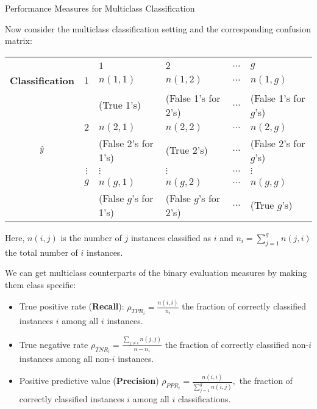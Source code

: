 \begin{vbframe}{Performance Measures for Multiclass Classification}
	\scriptsize{
		Now consider the multiclass classification setting and the corresponding confusion matrix:
		\begin{center}
			\tiny
			\begin{tabular}{cc|>{\centering\arraybackslash}p{8em}>{\centering\arraybackslash}p{8em}>{\centering\arraybackslash}p{5em}>{\centering\arraybackslash}p{8em}}
				& & \multicolumn{4}{c}{\bfseries True Class $y$} \\
				& & $1$ & $2$ & $\ldots$ & $g$  \\
				\hline
				\bfseries Classification     & $1$ & $n(1,1)$  &  $n(1,2)$  & $\ldots$ &  $n(1,g)$ \\
				& & (True 1's) & (False 1's for 2's) & $\ldots$ &  (False 1's for $g$'s)  \\
				& $2$ &  $n(2,1)$  &  $n(2,2)$  & $\ldots$ & $n(2,g)$  \\
				$\hat{y}$ & & (False 2's for 1's) & (True 2's) & $\ldots$ &  (False 2's for $g$'s)  \\
				& $\vdots$ & $\vdots$ & $\vdots$ & $\ldots$ & $\vdots$ \\
				& $g$ & $n(g,1)$ & $n(g,2)$  & $\ldots$ &  $n(g,g)$\\
				& & (False $g$'s for 1's) & (False $g$'s for 2's) & $\ldots$ &  (True $g$'s)  \\
			\end{tabular}
		\end{center}
		Here, $n(i,j)$ is the number of $j$ instances classified as $i$ and $n_i = \sum_{j=1}^g n(j,i)$ the total number of $i$ instances.
%		
		
		We can get multiclass counterparts of the binary evaluation measures by making them class specific: 
		
		\begin{itemize}
			
			\item True positive rate (\textbf{Recall}): $\rho_{TPR_i} = \frac{n(i,i)}{n_i}$ \quad the fraction of correctly classified instances $i$ among all $i$ instances.
			\item True negative rate $\rho_{TNR_i} = \frac{\sum_{j\neq i}n(j,j)}{n-n_i}$ \quad the fraction of correctly classified non-$i$ instances among all non-$i$ instances.
%			
			\item Positive predictive value (\textbf{Precision}) $\rho_{PPR_i} = \frac{n(i,i)}{\sum_{j=1}^g n(i,j)},$  the fraction of correctly classified instances $i$ among all $i$ classifications.
		\end{itemize}
	}
\end{vbframe}


